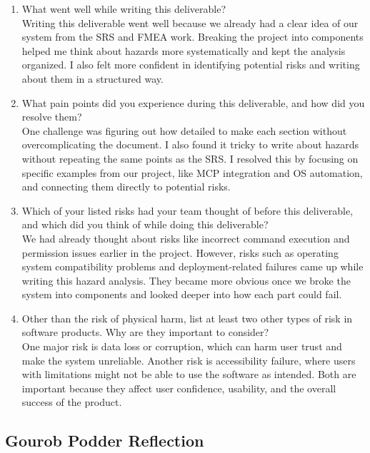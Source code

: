 \documentclass[12pt]{article}
\begin{document}
\begin{enumerate}
  \item What went well while writing this deliverable?\\
  Writing this deliverable went well because we already had a clear idea of
  our system from the SRS and FMEA work. Breaking the project into
  components helped me think about hazards more systematically and kept the
  analysis organized. I also felt more confident in identifying potential
  risks and writing about them in a structured way.

  \item What pain points did you experience during this deliverable, and how
  did you resolve them?\\
  One challenge was figuring out how detailed to make each section without
  overcomplicating the document. I also found it tricky to write about
  hazards without repeating the same points as the SRS. I resolved this by
  focusing on specific examples from our project, like MCP integration and
  OS automation, and connecting them directly to potential risks.

  \item Which of your listed risks had your team thought of before this
  deliverable, and which did you think of while doing this deliverable?\\
  We had already thought about risks like incorrect command execution and
  permission issues earlier in the project. However, risks such as operating
  system compatibility problems and deployment-related failures came up
  while writing this hazard analysis. They became more obvious once we broke
  the system into components and looked deeper into how each part could
  fail.

  \item Other than the risk of physical harm, list at least two other types
  of risk in software products. Why are they important to consider?\\
  One major risk is data loss or corruption, which can harm user trust and
  make the system unreliable. Another risk is accessibility failure, where
  users with limitations might not be able to use the software as intended.
  Both are important because they affect user confidence, usability, and the
  overall success of the product.
\end{enumerate}

\subsection{Gourob Podder Reflection}
\end{document}
